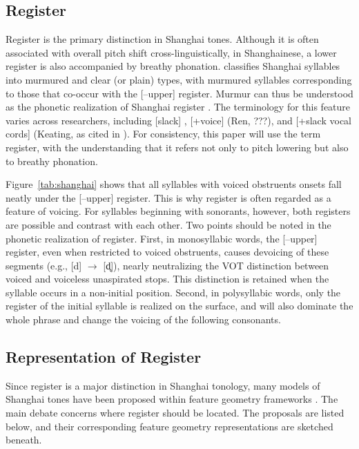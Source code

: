 \documentclass[11pt]{article}
\begin{document}

\subsection{Register}
Register is the primary distinction in Shanghai tones. Although it is often 
associated with overall pitch shift cross-linguistically, in Shanghainese, a 
lower register is also accompanied by breathy phonation. \citet{yip1980} 
classifies Shanghai syllables into murmured and clear (or plain) types, with 
murmured syllables corresponding to those that co-occur with the [–upper] 
register. Murmur can thus be 
understood as the phonetic realization of Shanghai register 
\citep{zhu1999shanghai}. The terminology for this feature varies across 
researchers, including [slack] \citep{duanmu1999metrical}, [+voice] (Ren, ???), 
and [+slack vocal cords] (Keating, as cited in \citealt{yip1993tonal}). For 
consistency, this paper will use the term register, with the understanding that 
it refers not only to pitch lowering but also to breathy phonation.

Figure~\ref{tab:shanghai} shows that all syllables with voiced obstruents 
onsets fall neatly under the [–upper] register. This is why register is often 
regarded as a feature of voicing. For syllables beginning with sonorants, 
however, both registers are possible and contrast with each other. Two points 
should be noted in the phonetic realization of register. First, in monosyllabic 
words, the [–upper] register, even when restricted to voiced obstruents, causes 
devoicing of these segments (e.g., [d] $\rightarrow$ [d̥]), nearly neutralizing 
the VOT distinction between voiced and voiceless unaspirated stops. This 
distinction is retained when the syllable occurs in a non-initial position. 
Second, in polysyllabic words, only the register of the initial syllable is 
realized on the surface, and will also dominate the whole phrase and change the 
voicing of the following consonants.

\subsection{Representation of Register}
Since register is a major distinction in Shanghai tonology, many models of 
Shanghai tones have been proposed within feature geometry frameworks 
\citep{clements1985,sagey1986feature}. The main debate concerns where register
should be
located. The proposals are listed below, and their corresponding feature
geometry representations are sketched beneath.
\end{document}
